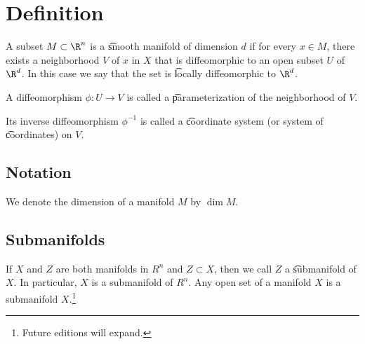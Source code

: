 

\section*{Definition}

A subset $M \subset \R ^n$ is a \t{smooth manifold} of dimension $d$ if for every $x \in M$, there exists a neighborhood $V$ of $x$ in $X$ that is diffeomorphic to an open subset $U$ of $\R ^d$.
In this case we say that the set is \t{locally diffeomorphic} to $\R ^d$.

A diffeomorphism $\phi : U \to V$ is called a \t{parameterization} of the neighborhood of $V$.

Its inverse diffeomorphism $\phi ^{-1}$ is called a \t{coordinate system} (or system of \t{coordinates}) on $V$.

\subsection*{Notation}

We denote the dimension of a manifold $M$ by $\dim M$.

\subsection*{Submanifolds}

If $X$ and $Z$ are both manifolds in $R^n$ and $Z \subset X$, then we call $Z$ a \t{submanifold} of $X$.
In particular, $X$ is a submanifold of $R^n$.
Any open set of a manifold $X$ is a submanifold $X$.\footnote{Future editions will expand.}

\blankpage